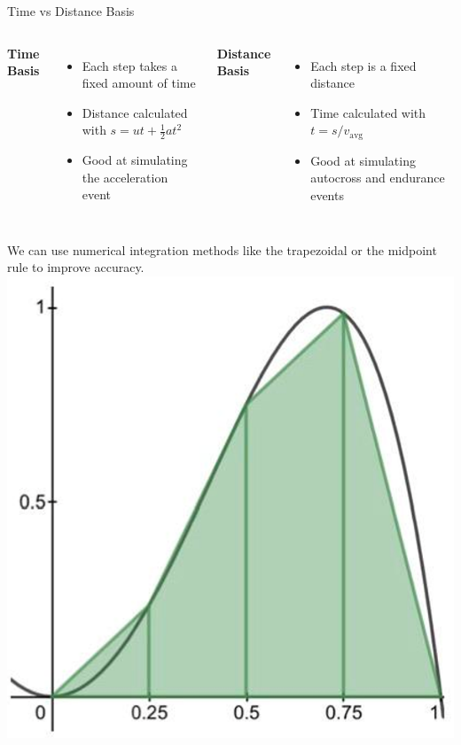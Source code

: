 \begin{frame}{Time vs Distance Basis}
    \begin{columns}
        \hfill \textbf{Time Basis} \hfill
        \begin{itemize}
            \item Each step takes a fixed amount of time
            \item Distance calculated with $s = ut + \frac{1}{2}at^2$
            \item Good at simulating the acceleration event
        \end{itemize}
        \hfill \textbf{Distance Basis} \hfill
        \begin{itemize}
            \item Each step is a fixed distance
            \item Time calculated with $t = s / v_\text{avg}$
            \item Good at simulating autocross and endurance events
        \end{itemize}
    \end{columns}
    \begin{columns}
        We can use numerical integration methods
        like the trapezoidal or the midpoint rule
        to improve accuracy.
        \includegraphics[width=\textwidth]{res/Trapezoidal Rule.png}

\end{columns}
\end{frame}
